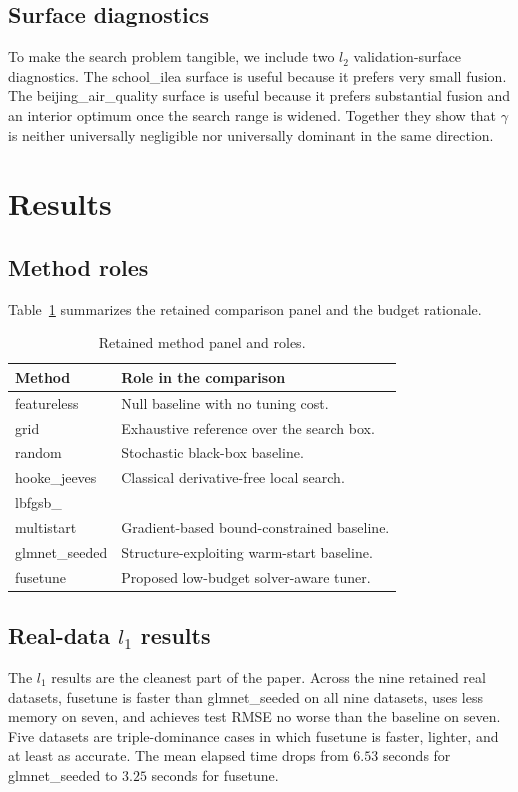 \documentclass[pdflatex,iicol,sn-mathphys-num]{sn-jnl}
\newcommand{\codeid}{\texttt{fusetune}}
\def\texttt#1{#1}%
\def\codeid{fusetune}%
\def\ell{l}%
\begin{document}
\subsection{Surface diagnostics}
To make the search problem tangible, we include two \(\ell_2\) validation-surface diagnostics. The \texttt{school\_ilea} surface is useful because it prefers very small fusion. The \texttt{beijing\_air\_quality} surface is useful because it prefers substantial fusion and an interior optimum once the search range is widened. Together they show that \(\gamma\) is neither universally negligible nor universally dominant in the same direction.

\section{Results}\label{sec:results}
\subsection{Method roles}
Table~\ref{tab:methods} summarizes the retained comparison panel and the budget rationale.

\begin{table}[t]
\caption{Retained method panel and roles.}
\label{tab:methods}
\centering
\scriptsize
\begin{tabular}{>{\raggedright\arraybackslash}p{}>{\raggedright\arraybackslash}p{}}
\toprule
Method & Role in the comparison \\
\midrule
\texttt{featureless} & Null baseline with no tuning cost. \\
\texttt{grid} & Exhaustive reference over the search box. \\
\texttt{random} & Stochastic black-box baseline. \\
\texttt{hooke\_jeeves} & Classical derivative-free local search. \\
\texttt{lbfgsb\_}\\\texttt{multistart} & Gradient-based bound-constrained baseline. \\
\texttt{glmnet\_seeded} & Structure-exploiting warm-start baseline. \\
\codeid & Proposed low-budget solver-aware tuner. \\
\bottomrule
\end{tabular}
\end{table}

\subsection{Real-data \texorpdfstring{\(\ell_1\)}{L1} results}
The \(\ell_1\) results are the cleanest part of the paper. Across the nine retained real datasets, \codeid{} is faster than \texttt{glmnet\_seeded} on all nine datasets, uses less memory on seven, and achieves test RMSE no worse than the baseline on seven. Five datasets are triple-dominance cases in which \codeid{} is faster, lighter, and at least as accurate. The mean elapsed time drops from \(6.53\) seconds for \texttt{glmnet\_seeded} to \(3.25\) seconds for \codeid{}.
\end{document}
